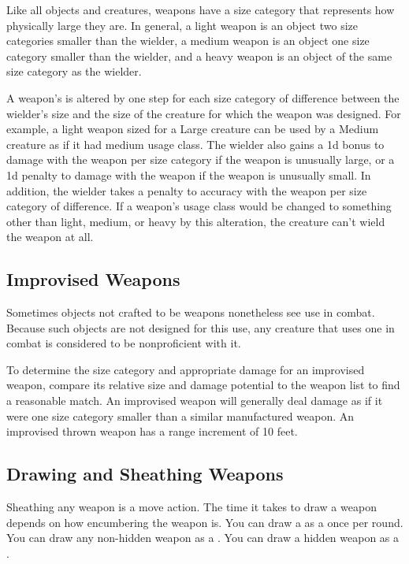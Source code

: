              Like all objects and creatures, weapons have a size category that represents how physically large they are. In general, a light weapon is an object two size categories smaller than the wielder, a medium weapon is an object one size category smaller than the wielder, and a heavy weapon is an object of the same size category as the wielder.

            \label{Inappropriately Sized Weapons} A weapon's  is altered by one step for each size category of difference between the wielder's size and the size of the creature for which the weapon was designed.
            For example, a light weapon sized for a Large creature can be used by a Medium creature as if it had medium usage class.
            The wielder also gains a \plus1d bonus to damage with the weapon per size category if the weapon is unusually large, or a \minus1d penalty to damage with the weapon if the weapon is unusually small.
            In addition, the wielder takes a  penalty to accuracy with the weapon per size category of difference.
            If a weapon's usage class would be changed to something other than light, medium, or heavy by this alteration, the creature can't wield the weapon at all.

    \subsection{Improvised Weapons}\label{Improvised Weapons} Sometimes objects not crafted to be weapons nonetheless see use in combat. Because such objects are not designed for this use, any creature that uses one in combat is considered to be nonproficient with it.

        To determine the size category and appropriate damage for an improvised weapon, compare its relative size and damage potential to the weapon list to find a reasonable match. An improvised weapon will generally deal damage as if it were one size category smaller than a similar manufactured weapon. An improvised thrown weapon has a range increment of 10 feet.

    \subsection{Drawing and Sheathing Weapons}\label{Drawing and Sheathing Weapons}
        Sheathing any weapon is a move action.
        The time it takes to draw a weapon depends on how encumbering the weapon is.
        You can draw a  as a  once per round.
        You can draw any non-hidden weapon as a .
        You can draw a hidden weapon as a .

